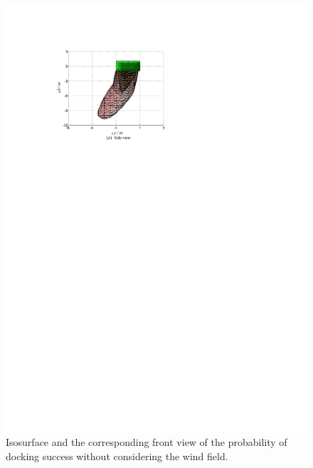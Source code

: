\begin{figure}[h]
\begin{minipage}{0.45\linewidth}
		\includegraphics[width=0.9\linewidth]{Figures/Figs_Ch13/Fig7_4}		
	\end{minipage}
	\caption{Isosurface and the corresponding front view of the probability of docking success without considering the wind field.}
	\label{Fig7}
\end{figure}

